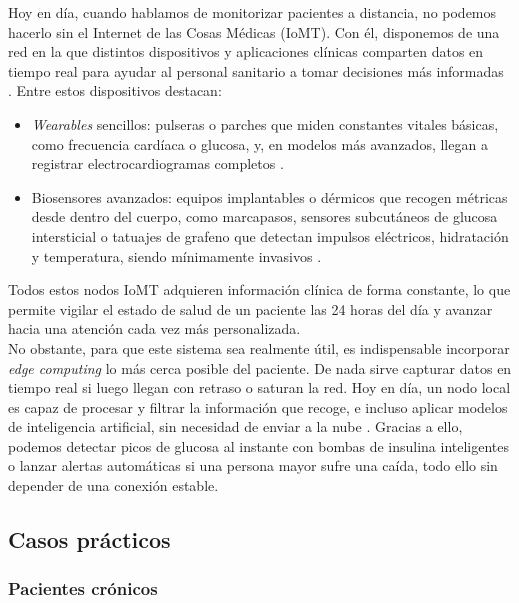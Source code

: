\documentclass[twoside, 12pt]{opticajnl}
\begin{document}
Hoy en día, cuando hablamos de monitorizar pacientes a distancia, no podemos hacerlo sin el Internet de las Cosas Médicas (IoMT). Con él, disponemos de una red en la que distintos dispositivos y aplicaciones clínicas comparten datos en tiempo real para ayudar al personal sanitario a tomar decisiones más informadas . Entre estos dispositivos destacan:
\begin{itemize}
    \item \textit{Wearables} sencillos: pulseras o parches que miden constantes vitales básicas, como frecuencia cardíaca o glucosa, y, en modelos más avanzados, llegan a registrar electrocardiogramas completos .
    \item Biosensores avanzados: equipos implantables o dérmicos que recogen métricas desde dentro del cuerpo, como marcapasos, sensores subcutáneos de glucosa intersticial o tatuajes de grafeno que detectan impulsos eléctricos, hidratación y temperatura, siendo mínimamente invasivos .
\end{itemize}

Todos estos nodos IoMT adquieren información clínica de forma constante, lo que permite vigilar el estado de salud de un paciente las 24 horas del día y avanzar hacia una atención cada vez más personalizada. \\

No obstante, para que este sistema sea realmente útil, es indispensable incorporar \textit{edge computing} lo más cerca posible del paciente. De nada sirve capturar datos en tiempo real si luego llegan con retraso o saturan la red. Hoy en día, un nodo local es capaz de procesar y filtrar la información que recoge, e incluso aplicar modelos de inteligencia artificial, sin necesidad de enviar a la nube . Gracias a ello, podemos detectar picos de glucosa al instante con bombas de insulina inteligentes o lanzar alertas automáticas si una persona mayor sufre una caída, todo ello sin depender de una conexión estable.   



\subsection{Casos prácticos}

\subsubsection{Pacientes crónicos}
\end{document}
